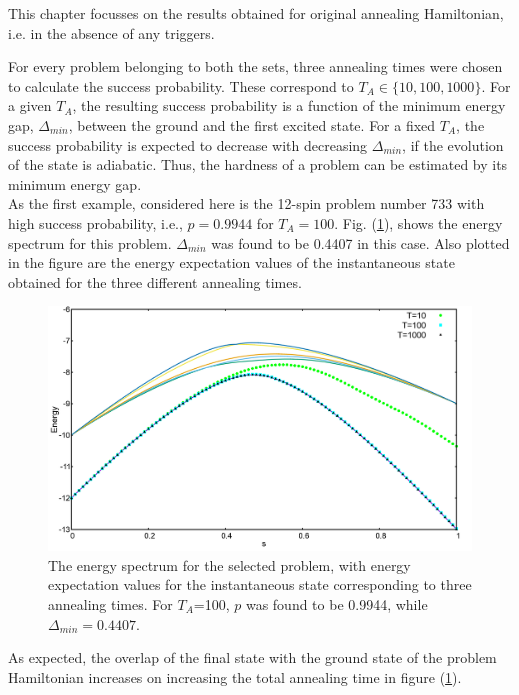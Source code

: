 \documentclass[../main.tex]{subfiles}
\begin{document}
This chapter focusses on the results obtained for original annealing Hamiltonian, i.e. in the absence of any triggers. 


For every problem belonging to both the sets, three annealing times were chosen to calculate the success probability. These correspond to $T_A \in \{ 10,100,1000 \}$. For a given $T_A$, the resulting success probability is a function of the minimum energy gap, $\Delta_{min}$, between the ground and the first excited state. For a fixed $T_A$, the success probability is expected to decrease with decreasing $\Delta_{min}$, if the evolution of the state is adiabatic. Thus, the hardness of a problem can be estimated by its minimum energy gap.\\


As the first example, considered here is the 12-spin problem number 733 with high success probability, i.e., $p=0.9944$ for $T_A=100$. Fig. (\ref{fig:o2}), shows the energy spectrum for this problem. $\Delta_{min}$ was found to be 0.4407 in this case.  Also plotted in the figure are the energy expectation values of the instantaneous state obtained for the three different annealing times.
\begin{figure}[H]
\centering 
\includegraphics[scale=0.24]{733_s12_O.png}
\caption{The energy spectrum for the selected problem, with energy expectation values for the instantaneous state corresponding to three annealing times. For $T_A$=100, $p$ was found to be 0.9944, while $\Delta_{min}=0.4407.$}
\label{fig:o2}
\end{figure}

As expected, the overlap of the final state with the ground state of the problem Hamiltonian increases on increasing the total annealing time in figure (\ref{fig:o2}).\\
\end{document}
